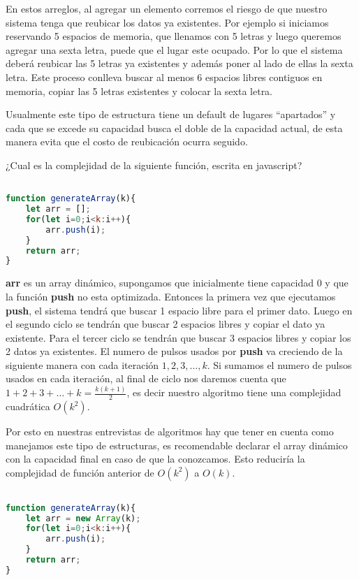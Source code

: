 En estos arreglos, al agregar un elemento corremos el riesgo de que nuestro sistema tenga que reubicar los datos ya existentes. Por ejemplo si iniciamos reservando 5 espacios de memoria, que llenamos con 5 letras y luego queremos agregar una sexta letra, puede que el lugar este ocupado. Por lo que el sistema deberá reubicar las 5 letras ya existentes y además poner al lado de ellas la sexta letra. Este proceso conlleva buscar al menos 6 espacios libres contiguos en memoria, copiar las 5 letras existentes y colocar la sexta letra. 

Usualmente este tipo de estructura tiene un default de lugares ``apartados'' y cada que se excede su capacidad busca el doble de la capacidad actual, de esta manera evita que el costo de reubicación ocurra seguido. 

¿Cual es la complejidad de la siguiente función, escrita en javascript?

\begin{lstlisting}[language=JavaScript, caption=Genera array]

function generateArray(k){
    let arr = [];
    for(let i=0;i<k:i++){
        arr.push(i);
    }
    return arr;
}
\end{lstlisting}

\textbf{arr} es un array dinámico, supongamos que inicialmente tiene capacidad 0 y que la función \textbf{push} no esta optimizada. Entonces la primera vez que ejecutamos \textbf{push}, el sistema tendrá que buscar 1 espacio libre para el primer dato. Luego en el segundo ciclo se tendrán que buscar 2 espacios libres y copiar el dato ya existente. Para el tercer ciclo se tendrán que buscar 3 espacios libres y copiar los 2 datos ya existentes. El numero de pulsos usados por \textbf{push} va creciendo de la siguiente manera con cada iteración $1,2,3,\dots,k$. Si sumamos el numero de pulsos usados en cada iteración, al final de ciclo nos daremos cuenta que $1+2+3+\dots+k = \frac{k(k+1)}{2}$, es decir nuestro algoritmo tiene una complejidad cuadrática $O(k^2)$. 

Por esto en nuestras entrevistas de algoritmos hay que tener en cuenta como manejamos este tipo de estructuras, es recomendable declarar el array dinámico con la capacidad final en caso de que la conozcamos. Esto reduciría la complejidad de función anterior de $O(k^2)$ a $O(k)$.


\begin{lstlisting}[language=JavaScript, caption=Genera array  con complejidad lineal]

function generateArray(k){
    let arr = new Array(k);
    for(let i=0;i<k:i++){
        arr.push(i);
    }
    return arr;
}
\end{lstlisting}

